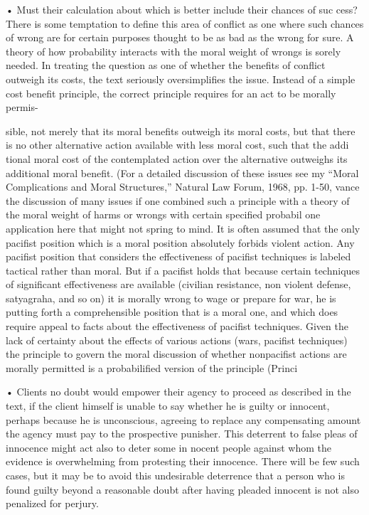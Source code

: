 \documentclass[11pt,openany]{book}
\begin{document}
{\footnotesize\setlength{\parindent}{0pt}\setlength{\parskip}{5pt}

• Must their calculation about which is better include their chances of suc cess? There is some temptation to define this area of conflict as one where such chances of wrong are for certain purposes thought to be as bad as the wrong for sure. A theory of how probability interacts with the moral weight of wrongs is sorely needed. In treating the question as one of whether the benefits of conflict outweigh its costs, the text seriously oversimplifies the issue. Instead of a simple cost benefit principle, the correct principle requires for an act to be morally permis-\par

sible, not merely that its moral benefits outweigh its moral costs, but that there is no other alternative action available with less moral cost, such that the addi tional moral cost of the contemplated action over the alternative outweighs its additional moral benefit. (For a detailed discussion of these issues see my ``Moral Complications and Moral Structures,'' Natural Law Forum, 1968, pp. 1-50, vance the discussion of many issues if one combined such a principle with a theory of the moral weight of harms or wrongs with certain specified probabil one application here that might not spring to mind. It is often assumed that the only pacifist position which is a moral position absolutely forbids violent action. Any pacifist position that considers the effectiveness of pacifist techniques is labeled tactical rather than moral. But if a pacifist holds that because certain techniques of significant effectiveness are available (civilian resistance, non violent defense, satyagraha, and so on) it is morally wrong to wage or prepare for war, he is putting forth a comprehensible position that is a moral one, and which does require appeal to facts about the effectiveness of pacifist techniques. Given the lack of certainty about the effects of various actions (wars, pacifist techniques) the principle to govern the moral discussion of whether nonpacifist actions are morally permitted is a probabilified version of the principle (Princi\par

• Clients no doubt would empower their agency to proceed as described in the text, if the client himself is unable to say whether he is guilty or innocent, perhaps because he is unconscious, agreeing to replace any compensating amount the agency must pay to the prospective punisher. This deterrent to false pleas of innocence might act also to deter some in nocent people against whom the evidence is overwhelming from protesting their innocence. There will be few such cases, but it may be to avoid this undesirable deterrence that a person who is found guilty beyond a reasonable doubt after having pleaded innocent is not also penalized for perjury.\par

}
\end{document}
